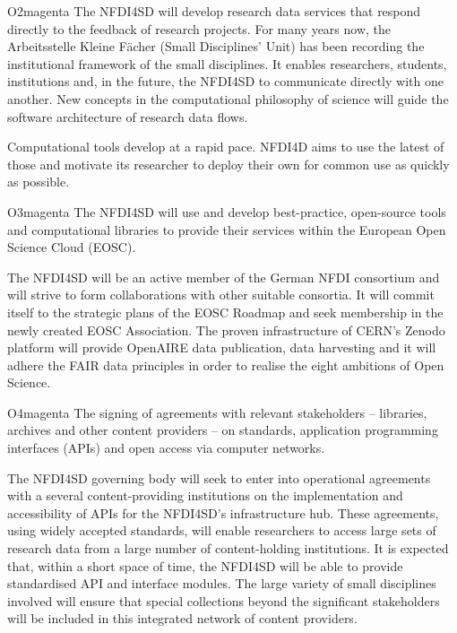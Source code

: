 \documentclass[
  english,
  paper=a4,
  oneside,captions=tableheading
]{scrbook}
\begin{document}
\begin{awesomeblock}[magenta]{1pt}{O2}{magenta} The NFDI4SD will develop research data services that respond directly to the feedback of research projects. For many years now, the Arbeitsstelle Kleine Fächer (Small Disciplines’ Unit) has been recording the institutional framework of the small disciplines. It enables researchers, students, institutions and, in the future, the NFDI4SD to communicate directly with one another. New concepts in the computational philosophy of science will guide the software architecture of research data flows.\end{awesomeblock}

Computational tools develop at a rapid pace. NFDI4D aims to use the
latest of those and motivate its researcher to deploy their own for
common use as quickly as possible.

\begin{awesomeblock}[magenta]{1pt}{O3}{magenta} The NFDI4SD will use and develop best-practice, open-source tools and computational libraries to provide their services within the European Open Science Cloud (EOSC).\end{awesomeblock}

The NFDI4SD will be an active member of the German NFDI consortium and
will strive to form collaborations with other suitable consortia. It
will commit itself to the strategic plans of the EOSC Roadmap and seek
membership in the newly created EOSC Association. The proven
infrastructure of CERN's Zenodo platform will provide OpenAIRE data
publication, data harvesting and it will adhere the FAIR data principles
in order to realise the eight ambitions of Open Science.

\begin{awesomeblock}[magenta]{1pt}{O4}{magenta} The signing of agreements with relevant stakeholders – libraries, archives and other content providers – on standards, application programming interfaces (APIs) and open access via computer networks.\end{awesomeblock}

The NFDI4SD governing body will seek to enter into operational
agreements with a several content-providing institutions on the
implementation and accessibility of APIs for the NFDI4SD's
infrastructure hub. These agreements, using widely accepted standards,
will enable researchers to access large sets of research data from a
large number of content-holding institutions. It is expected that,
within a short space of time, the NFDI4SD will be able to provide
standardised API and interface modules. The large variety of small
disciplines involved will ensure that special collections beyond the
significant stakeholders will be included in this integrated network of
content providers.
\end{document}
